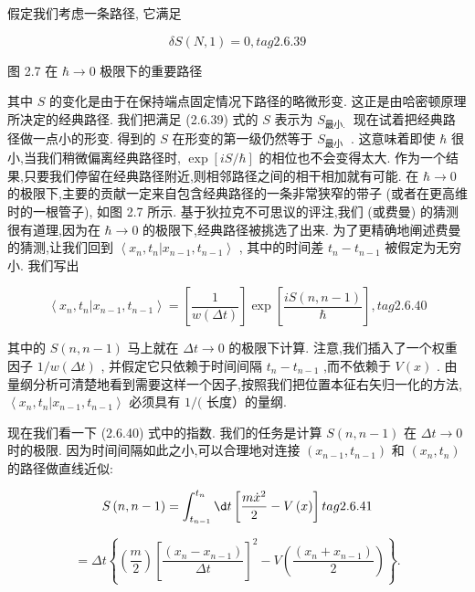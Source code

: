 \documentclass[lang=cn,newtx,10pt,scheme=chinese,thmcnt=section]{elegantbook}
\begin{document}
假定我们考虑一条路径, 它满足

$$
{\delta S}\left( {N,1}\right) = 0, tag{2.6.39}
$$


图 2.7 在 $\hbar \rightarrow 0$ 极限下的重要路径

其中 $S$ 的变化是由于在保持端点固定情况下路径的略微形变. 这正是由哈密顿原理所决定的经典路径. 我们把满足 (2.6.39) 式的 $S$ 表示为 ${S}_{\text{最小. }}$ 现在试着把经典路径做一点小的形变. 得到的 $S$ 在形变的第一级仍然等于 ${S}_{\text{最小 }}$ . 这意味着即使 $\hbar$ 很小,当我们稍微偏离经典路径时, $\exp \left\lbrack {{iS}/\hbar }\right\rbrack$ 的相位也不会变得太大. 作为一个结果,只要我们停留在经典路径附近,则相邻路径之间的相干相加就有可能. 在 $\hbar \rightarrow 0$ 的极限下,主要的贡献一定来自包含经典路径的一条非常狭窄的带子 (或者在更高维时的一根管子), 如图 2.7 所示. 基于狄拉克不可思议的评注,我们 (或费曼) 的猜测很有道理,因为在 $\hbar \rightarrow 0$ 的极限下,经典路径被挑选了出来. 为了更精确地阐述费曼的猜测,让我们回到 $\left\langle {{x}_{n},{t}_{n} | {x}_{n - 1},{t}_{n - 1}}\right\rangle$ , 其中的时间差 ${t}_{n} - {t}_{n - 1}$ 被假定为无穷小. 我们写出

$$
\left\langle {{x}_{n},{t}_{n} | {x}_{n - 1},{t}_{n - 1}}\right\rangle = \left\lbrack \frac{1}{w\left( {\Delta t}\right) }\right\rbrack \exp \left\lbrack \frac{{iS}\left( {n, n - 1}\right) }{\hbar }\right\rbrack , tag{2. 6.40}
$$

其中的 $S\left( {n, n - 1}\right)$ 马上就在 ${\Delta t} \rightarrow 0$ 的极限下计算. 注意,我们插入了一个权重因子 $1/w\left( {\Delta t}\right)$ , 并假定它只依赖于时间间隔 ${t}_{n} - {t}_{n - 1}$ ,而不依赖于 $V\left( x\right)$ . 由量纲分析可清楚地看到需要这样一个因子,按照我们把位置本征右矢归一化的方法, $\left\langle {{x}_{n},{t}_{n} | {x}_{n - 1},{t}_{n - 1}}\right\rangle$ 必须具有 $1/($ 长度）的量纲.

现在我们看一下 (2.6.40) 式中的指数. 我们的任务是计算 $S\left( {n, n - 1}\right)$ 在 ${\Delta t} \rightarrow 0$ 时的极限. 因为时间间隔如此之小,可以合理地对连接 $\left( {{x}_{n - 1},{t}_{n - 1}}\right)$ 和 $\left( {{x}_{n},{t}_{n}}\right)$ 的路径做直线近似:

$$
S\left( {n, n - 1}\right) = \int_{{t}_{n - 1}}^{{t}_{n}}{\d t}\left\lbrack {\frac{m{\dot{x}}^{2}}{2} - V\left( x\right) }\right\rbrack tag{2.6.41}
$$

$$
= {\Delta t}\left\{ {\left( \frac{m}{2}\right) {\left\lbrack \frac{\left( {x}_{n} - {x}_{n - 1}\right) }{\Delta t}\right\rbrack }^{2} - V\left( \frac{\left( {x}_{n} + {x}_{n - 1}\right) }{2}\right) }\right\} .
$$
\end{document}
